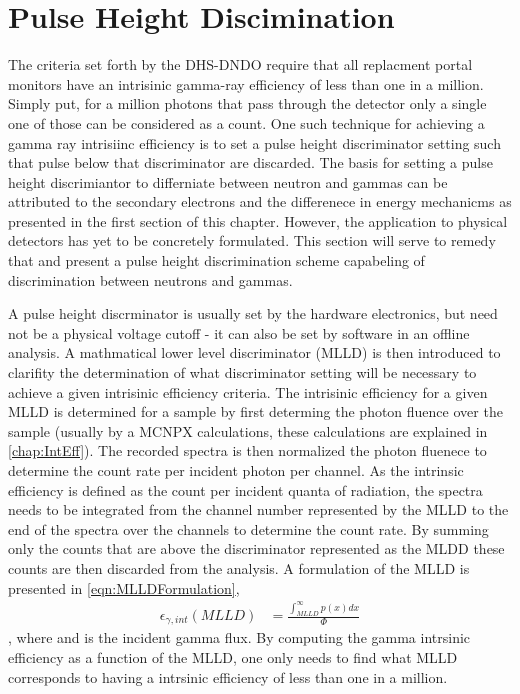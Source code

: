 \section{Pulse Height Discimination}
\label{sec:PulseHeightDiscrm}
The criteria set forth by the DHS-DNDO require that all replacment portal monitors have an intrisinic gamma-ray efficiency of less than one in a million.
Simply put, for a million photons that pass through the detector only a single one of those can be considered as a count.
One such technique for achieving a gamma ray intrisiinc efficiency is to set a pulse height discriminator setting such that pulse below that discriminator are discarded.
The basis for setting a pulse height discrimiantor to differniate between neutron and gammas can be attributed to the secondary electrons and the differenece in energy mechanicms as presented in the first section of this chapter.
However, the application to physical detectors has yet to be concretely formulated.
This section will serve to remedy that and present a pulse height discrimination scheme capabeling of discrimination between neutrons and gammas.

A pulse height discrminator is usually set by the hardware electronics, but need not be a physical voltage cutoff - it can also be set by software in an offline analysis.
A mathmatical lower level discriminator (MLLD) is then introduced to clarifity the determination of what discriminator setting will be necessary to achieve a given intrisinic efficiency criteria.
The intrisinic efficiency for a given MLLD is determined for a sample by first determing the photon fluence over the sample (usually by a MCNPX calculations, these calculations are explained in \autoref{chap:IntEff}).
The recorded spectra is then normalized the photon fluenece to determine the count rate per incident photon per channel.
As the intrinsic efficiency is defined as the count per incident quanta of radiation, the spectra needs to be integrated from the channel number represented by the MLLD to the end of the spectra over the channels to determine the count rate.
By summing only the counts that are above the discriminator represented as the MLDD these counts are then discarded from the analysis.
A formulation of the MLLD is presented in \eqref{eqn:MLLDFormulation},
\begin{align}
	\epsilon_{\gamma,int}\left(MLLD\right) &= \frac{\int_{MLLD}^{\infty}p(x)dx}{\Phi}
  \label{eqn:MLLDFormulation}
\end{align},
where  and  is the incident gamma flux.
By computing the gamma intrsinic efficiency as a function of the MLLD, one only needs to find what MLLD corresponds to having a intrsinic efficiency of less than one in a million.

